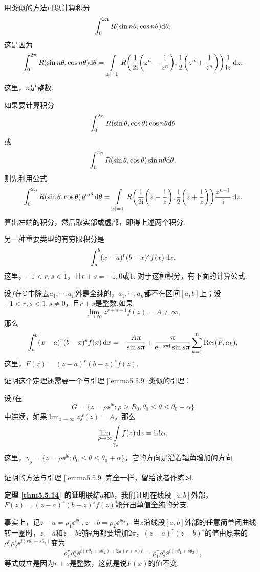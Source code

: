用类似的方法可以计算积分
\[\int_0^{2\pi}R(\sin n\theta,\cos n\theta)\textrm d\theta,\]
这是因为
\[\int_0^{2\pi}R(\sin n\theta,\cos n\theta)\textrm d\theta=
\int\limits_{|z|=1}R\bigg(\frac1{2\ii}\bigg(z^n-\frac1{z^n}\bigg),
\frac12\bigg(z^n+\frac1{z^n}\bigg)\bigg)\frac1{\ii z}\dz.\]
这里，$n$是整数.

如果要计算积分
\[\int_0^{2\pi}R(\sin \theta,\cos \theta)\cos n\theta\textrm d\theta\]
或
\[\int_0^{2\pi}R(\sin \theta,\cos \theta)\sin n\theta\textrm d\theta,\]
则先利用公式
\begin{equation}\label{eq5.5.10}
\int_0^{2\pi}R(\sin\theta,\cos\theta)\ee^{\ii n\theta}\textrm d\theta=
\int\limits_{|z|=1}R\bigg(\frac1{2\ii}\bigg(z-\frac1z\bigg),
\frac12\bigg(z+\frac1z\bigg)\bigg)\frac{z^{n-1}}{\ii}\dz.
\end{equation}
算出左端的积分，然后取实部或虚部，即得上述两个积分.

另一种重要类型的有穷限积分是
\[\int_a^b(x-a)^r(b-x)^sf(x)\dx,\]
这里，$-1<r,s<1$，且$r+s=-1,0$或$1$. 对于这种积分，有下面的计算公式.

\begin{theorem}\label{thm5.5.14}
设$f$在$\MC$中除去$a_1,\cdots,a_n$外是全纯的，$a_1,\cdots,a_n$都不在区间$[a,b]$上；设$-1<r,s<1,s\ne0$，且$r+s$是整数.如果
\[\lim_{z\to\infty}z^{r+s+1}f(z)=A\ne\infty,\]
那么
\begin{equation}\label{eq5.5.11}
\int_a^b(x-a)^r(b-x)^sf(x)\dx=-\frac{A\pi}{\sin s\pi}+\frac\pi{\ee^{-s\pi\ii}\sin
s\pi}\sum_{k=1}^n\Res(F,a_k),
\end{equation}
这里，$F(z)=(z-a)^r(b-z)^sf(z)$.
\end{theorem}

证明这个定理还需要一个与引理 \ref{lemma5.5.9} 类似的引理：
\begin{lemma}\label{lemma5.5.15}
设$f$在
\[G=\{z=\rho\ee^{\ii\theta}:\rho\ge R_0,\theta_0\le\theta\le\theta_0+\alpha\}\]
中连续，如果$\lim_{z\to\infty}zf(z)=A$，那么
\[\lim_{\rho\to\infty}\int\limits_{\gamma_\rho}f(z)\dz=\ii A\alpha,\]
这里，$\gamma_\rho=\{z=\rho\ee^{\ii\theta}:\theta_0\le\theta\le\theta_0+\alpha\}$，它的方向是沿着辐角增加的方向.

证明的方法与引理 \ref{lemma5.5.9} 完全一样，留给读者作练习.
\end{lemma}

\textbf{定理 \ref{thm5.5.14} 的证明}\quad 联结$a$和$b$，我们证明在线段$[a,b]$外部，$F(z)=(z-a)^r(b-z)^sf(z)$能分出单值全纯的分支.

事实上，记$z-a=\rho_1\ee^{\ii\theta_1},z-b=\rho_2\ee^{\ii\theta_2}$，当$z$沿线段$[a,b]$外部的任意简单闭曲线转一圈时，$z-a$和$z-b$的辐角都要增加$2\pi$，$(z-a)^r(z-b)^s$的值由原来的$\rho_1^r\rho_2^s\ee^{\ii(r\theta_1+s\theta_2)}$变为
\[\rho_1^r\rho_2^s\ee^{\ii(r\theta_1+s\theta_2)+2\pi(r+s)\ii}=
\rho_1^r\rho_2^s\ee^{\ii(r\theta_1+s\theta_2)},\]
等式成立是因为$r+s$是整数，这就是说$F(x)$的值不变.

